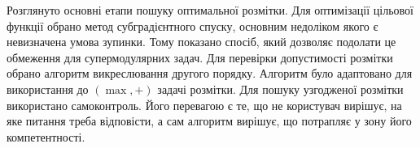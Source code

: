 \chapterConclusion

Розглянуто основні етапи пошуку оптимальної розмітки.
Для оптимізації цільової функції обрано метод субградієнтного спуску, основним недоліком
якого є невизначена умова зупинки. Тому показано спосіб, який дозволяє подолати це обмеження для супермодулярних задач.
Для перевірки допустимості розмітки обрано алгоритм викреслювання другого порядку. Алгоритм було адаптовано
для використання до $(\max,+)$ задачі розмітки. Для пошуку узгодженої розмітки використано самоконтроль. Його перевагою є те, 
що не користувач вирішує, на яке питання треба відповісти, а сам алгоритм вирішує, що потрапляє у
зону його компетентності.